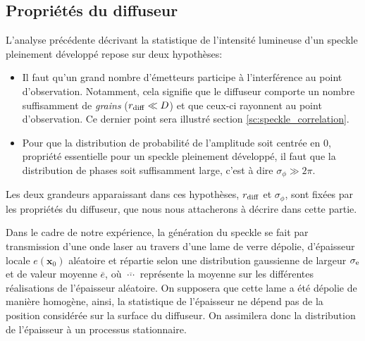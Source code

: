 \subsection{Propriétés du diffuseur}
\label{sc:prop_diffuseur}
L'analyse précédente décrivant la statistique de l'intensité lumineuse d'un speckle pleinement développé repose sur deux hypothèses: 
\begin{itemize}
\item[\textendash] Il faut qu'un grand nombre d'émetteurs participe à l'interférence au point d'observation. Notamment, cela signifie que le diffuseur comporte un nombre suffisamment de \emph{grains} ($r_{\mathrm{diff}} \ll D$)  et que ceux-ci rayonnent au point d'observation. Ce dernier point sera illustré section \ref{sc:speckle_correlation}.
\item[\textendash] Pour que la distribution de probabilité de l'amplitude soit centrée en 0, propriété essentielle pour un speckle pleinement développé, il faut que la distribution de phases soit suffisamment large, c'est à dire $\sigma_\phi \gg 2\pi$. 
\end{itemize}
Les deux grandeurs apparaissant dans ces hypothèses, $r_{\mathrm{diff}}$ et $\sigma_\phi$, sont fixées par les propriétés du diffuseur, que nous nous attacherons à décrire dans cette partie.

Dans le cadre de notre expérience, la génération du speckle se fait par transmission d'une onde laser au travers d'une lame de verre dépolie, d'épaisseur locale $e(\mathbf{x}_0)$ aléatoire et répartie selon une distribution gaussienne de largeur $\sigma_{\mathrm{e}}$ et de valeur moyenne $\overline{e}$, où $\overline{\:\cdots\:}$ représente la moyenne sur les différentes réalisations de l'épaisseur aléatoire. On supposera que cette lame a été dépolie de manière homogène, ainsi, la statistique de l'épaisseur ne dépend pas de la position considérée sur la surface du diffuseur. On assimilera donc la distribution de l'épaisseur à un processus stationnaire. 

